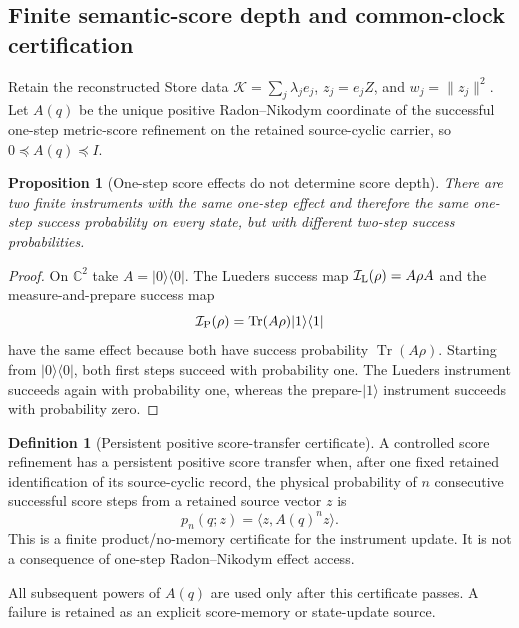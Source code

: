 \documentclass[11pt]{article}
\newtheorem{proposition}[theorem]{Proposition}
\theoremstyle{definition}
\newtheorem{definition}[theorem]{Definition}
\theoremstyle{remark}
\newcommand{\C}{\mathbb C}
\newcommand{\Tr}{\operatorname{Tr}}
\newcommand{\norm}[1]{\lVert#1\rVert}
\begin{document}
\subsection{Finite semantic-score depth and common-clock certification}
\label{sec:semantic-clock-certification-master}

Retain the reconstructed Store data
$\mathscr K=\sum_j\lambda_je_j$, $z_j=e_jZ$, and
$w_j=\norm{z_j}^2$.  Let $A(q)$ be the unique positive Radon--Nikodym
coordinate of the successful one-step metric-score refinement on the retained
source-cyclic carrier, so $0\preceq A(q)\preceq I$.

\begin{proposition}[One-step score effects do not determine score depth]
\label{prop:score-effect-depth-no-go-master}
There are two finite instruments with the same one-step effect and therefore
the same one-step success probability on every state, but with different
two-step success probabilities.
\end{proposition}

\begin{proof}
On $\C^2$ take $A=|0\rangle\langle0|$.  The Lueders success map
$\mathcal I_{\rm L}(\rho)=A\rho A$ and the measure-and-prepare success map
\[
  \mathcal I_{\rm P}(\rho)
  =\Tr(A\rho)|1\rangle\langle1|
\]
have the same effect because both have success probability $\Tr(A\rho)$.
Starting from $|0\rangle\langle0|$, both first steps succeed with probability
one.  The Lueders instrument succeeds again with probability one, whereas the
prepare-$|1\rangle$ instrument succeeds with probability zero.
\end{proof}

\begin{definition}[Persistent positive score-transfer certificate]
\label{def:persistent-score-transfer-master}
A controlled score refinement has a persistent positive score transfer when,
after one fixed retained identification of its source-cyclic record, the
physical probability of $n$ consecutive successful score steps from a retained
source vector $z$ is
\begin{equation}
  \boxed{p_n(q;z)=\langle z,A(q)^nz\rangle.}
  \label{eq:persistent-score-depth-master}
\end{equation}
This is a finite product/no-memory certificate for the instrument update.  It
is not a consequence of one-step Radon--Nikodym effect access.
\end{definition}

All subsequent powers of $A(q)$ are used only after this certificate passes.
A failure is retained as an explicit score-memory or state-update source.
\end{document}
